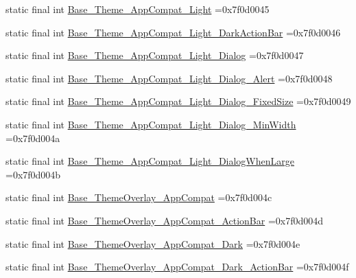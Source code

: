 \begin{DoxyCompactItemize}
static final int \mbox{\hyperlink{classcom_1_1example_1_1trainawearapplication_1_1_r_1_1style_a4b4e7a5882722b31cdc39551cef3c1f6}{Base\+\_\+\+Theme\+\_\+\+App\+Compat\+\_\+\+Light}} =0x7f0d0045
\item 
static final int \mbox{\hyperlink{classcom_1_1example_1_1trainawearapplication_1_1_r_1_1style_a59fab1aab0f101b0a78cb59a1c55ae72}{Base\+\_\+\+Theme\+\_\+\+App\+Compat\+\_\+\+Light\+\_\+\+Dark\+Action\+Bar}} =0x7f0d0046
\item 
static final int \mbox{\hyperlink{classcom_1_1example_1_1trainawearapplication_1_1_r_1_1style_a58e2547e1a99e70696bb583de74004c7}{Base\+\_\+\+Theme\+\_\+\+App\+Compat\+\_\+\+Light\+\_\+\+Dialog}} =0x7f0d0047
\item 
static final int \mbox{\hyperlink{classcom_1_1example_1_1trainawearapplication_1_1_r_1_1style_abedcf903270242091d77984d05ef8b7c}{Base\+\_\+\+Theme\+\_\+\+App\+Compat\+\_\+\+Light\+\_\+\+Dialog\+\_\+\+Alert}} =0x7f0d0048
\item 
static final int \mbox{\hyperlink{classcom_1_1example_1_1trainawearapplication_1_1_r_1_1style_aa03790629d7181ba9fd5b600306e193d}{Base\+\_\+\+Theme\+\_\+\+App\+Compat\+\_\+\+Light\+\_\+\+Dialog\+\_\+\+Fixed\+Size}} =0x7f0d0049
\item 
static final int \mbox{\hyperlink{classcom_1_1example_1_1trainawearapplication_1_1_r_1_1style_a9da28104334b11317a2b2146381d7f37}{Base\+\_\+\+Theme\+\_\+\+App\+Compat\+\_\+\+Light\+\_\+\+Dialog\+\_\+\+Min\+Width}} =0x7f0d004a
\item 
static final int \mbox{\hyperlink{classcom_1_1example_1_1trainawearapplication_1_1_r_1_1style_a506704d57b3c6d246f9574c43628ecb4}{Base\+\_\+\+Theme\+\_\+\+App\+Compat\+\_\+\+Light\+\_\+\+Dialog\+When\+Large}} =0x7f0d004b
\item 
static final int \mbox{\hyperlink{classcom_1_1example_1_1trainawearapplication_1_1_r_1_1style_a946bb97cb408c913bb6bd6de13efafe1}{Base\+\_\+\+Theme\+Overlay\+\_\+\+App\+Compat}} =0x7f0d004c
\item 
static final int \mbox{\hyperlink{classcom_1_1example_1_1trainawearapplication_1_1_r_1_1style_a81939b3e206eec38473071bbc5ec5533}{Base\+\_\+\+Theme\+Overlay\+\_\+\+App\+Compat\+\_\+\+Action\+Bar}} =0x7f0d004d
\item 
static final int \mbox{\hyperlink{classcom_1_1example_1_1trainawearapplication_1_1_r_1_1style_a7b1f831304be84fc17086af5b83eb53c}{Base\+\_\+\+Theme\+Overlay\+\_\+\+App\+Compat\+\_\+\+Dark}} =0x7f0d004e
\item 
static final int \mbox{\hyperlink{classcom_1_1example_1_1trainawearapplication_1_1_r_1_1style_aaae080c920ac4ea08ea8daaf3e488a3d}{Base\+\_\+\+Theme\+Overlay\+\_\+\+App\+Compat\+\_\+\+Dark\+\_\+\+Action\+Bar}} =0x7f0d004f

\end{DoxyCompactItemize}
